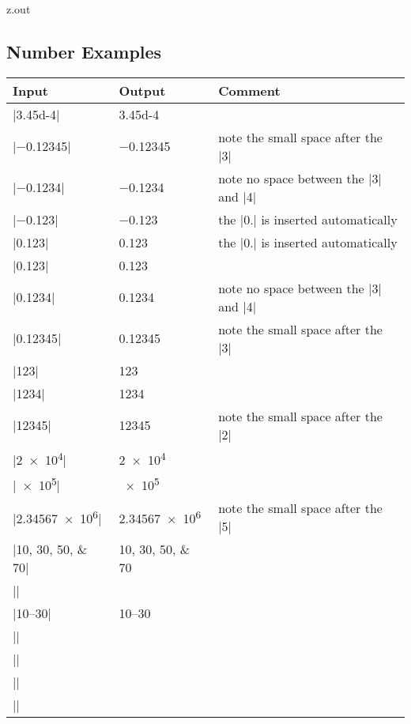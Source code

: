 \begin{VerbatimOut}{z.out}

\subsection{Number Examples}

\begin{inlinetable}
  \begin{tabular}{@{}lll@{}}
    \toprule
    \textbf{Input}& \textbf{Output}& \textbf{Comment}\\
    \midrule
    |\num{3.45d-4}|&         \num{3.45d-4}\\
    |\num{-0.12345}|&        \num{-0.12345}&               note the small space after the |3|\\
    |\num{-0.1234}|&         \num{-0.1234}&                note no space between the |3| and |4|\\
    |\num{-.123}|&           \num{-.123}&                  the |0.| is inserted automatically\\
    |\num{.123}|&            \num{.123}&                   the |0.| is inserted automatically\\
    |\num{0.123}|&           \num{0.123}\\
    |\num{0.1234}|&          \num{0.1234}&                 note no space between the |3| and |4|\\
    |\num{0.12345}|&         \num{0.12345}&                note the small space after the |3|\\
    |\num{123}|&             \num{123}\\
    |\num{1234}|&            \num{1234}\\
    |\num{12345}|&           \num{12345}&                  note the small space after the |2|\\
    |\num{2e4}|&             \num{2e4}\\
    |\num{e5}|&              \num{e5}\\
    |\num{2.34567e6}|&       \num{2.34567e6}&              note the small space after the |5|\\[6pt]
    |\numlist{10;30;50;70}|& \numlist{10;30;50;70}\\[6pt]
    |\numproduct{10 x 20}|&  \numproduct{10 x 20}\\[6pt]
    |\numrange{10}{30}|&     \numrange{10}{30}\\[6pt]
    |\complexnum{-4}|&       \complexnum{-4}\\
    |\complexnum{-3-2i}|&    \complexnum{-3-2i}\\
    |\complexnum{2+3i}|&     \complexnum{2+3i}\\
    |\complexnum{4+-5i}|&    \complexnum{4+-5i}\\
    \bottomrule
  \end{tabular}
\end{inlinetable}
\end{VerbatimOut}

